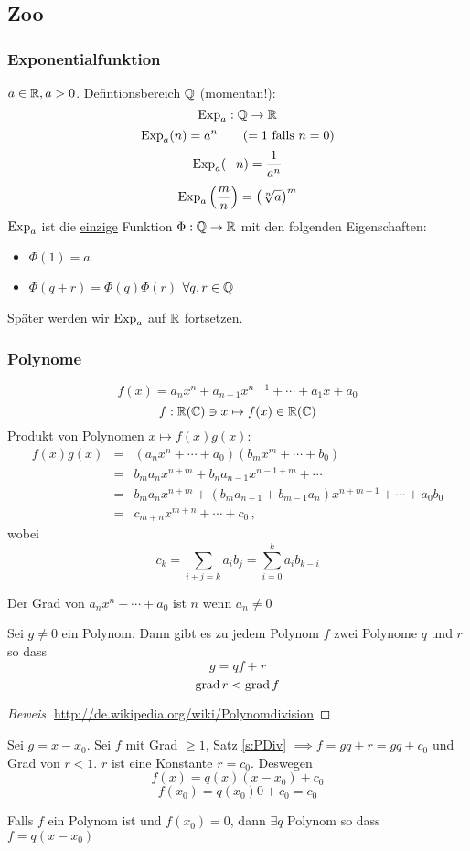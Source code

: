 \subsection{Zoo}
\subsubsection{Exponentialfunktion}
$a\in\mathbb{R}, a>0$. Defintionsbereich $\mathbb{Q}$ (momentan!):
\[\operatorname{Exp}_a:\mathbb{Q}\to\mathbb{R}\]
\[\operatorname{Exp}_a(n)=a^n \qquad(=1 \mbox{ falls }n=0)\]
\[\operatorname{Exp}_a(-n)=\frac{1}{a^n}\]
\[\operatorname{Exp}_a\left( \frac{m}{n} \right) = \left( \sqrt[n]{a} \right)^m\]
$\operatorname{Exp}_a$ ist die \ul{einzige} Funktion $\Phi:\mathbb{Q}\to\mathbb{R}$ mit den folgenden Eigenschaften:
\begin{itemize}
  \item $\Phi(1)=a$
  \item $\Phi(q+r)=\Phi(q)\Phi(r)$ $\forall q,r\in\mathbb{Q}$
\end{itemize}
\begin{Bem}
  Später werden wir $\operatorname{Exp}_a$ auf \ul{$\mathbb{R}$ fortsetzen}.
\end{Bem}
\subsubsection{Polynome}
\[f(x)=a_nx^n+a_{n-1}x^{n-1}+\cdots+a_1x+a_0\]
\[f:\mathbb{R} (\mathbb{C}) \ni x\mapsto f(x)\in\mathbb{R} (\mathbb{C})\]
Produkt von Polynomen $x\mapsto f(x)g(x)$:
\begin{eqnarray*}
  f(x)g(x) &=& \left( a_nx^n+\cdots+a_0 \right)\left( b_mx^m+\cdots+b_0 \right)\\
&=&  b_ma_nx^{n+m}+b_na_{n-1}x^{n-1+m}+\cdots\\
&=&  b_ma_nx^{n+m}+\left( b_ma_{n-1}+b_{m-1}a_n \right)x^{n+m-1}+\cdots + a_0b_0\\ 
&=&
  c_{m+n}x^{m+n} +\cdots +c_0\, ,
\end{eqnarray*}
wobei
\[c_k=\sum_{i+j=k}a_ib_j=\sum_{i=0}^ka_ib_{k-i}\]
\begin{Def}
  Der Grad von $a_nx^n+\cdots+a_0$ ist $n$ wenn $a_n\neq 0$
\end{Def}
\begin{Sat}\label{s:PDiv}
  Sei $g\neq 0$ ein Polynom. Dann gibt es zu jedem Polynom $f$ zwei Polynome $q$ und $r$ so dass
  \[g=qf+r\]
  \[\operatorname{grad} r < \operatorname{grad} f\]
\end{Sat}
\begin{proof}[Beweis]
  \url{http://de.wikipedia.org/wiki/Polynomdivision}
\end{proof}
\begin{Bem}
  Sei $g=x-x_0$. Sei $f$ mit Grad $\geq 1$, Satz \ref{s:PDiv} 
$\implies f=gq+r=gq+c_0$ und Grad von $r < 1$. $r$ ist eine Konstante $r=c_0$. Deswegen
  \[f(x)=q(x)(x-x_0)+c_0\]
  \[f(x_0)=q(x_0)0+c_0 = c_0\]
\end{Bem}
\begin{Kor}
  Falls $f$ ein Polynom ist und $f(x_0)=0$, dann $\exists q$ Polynom so dass $f=q(x-x_0)$
\end{Kor}

